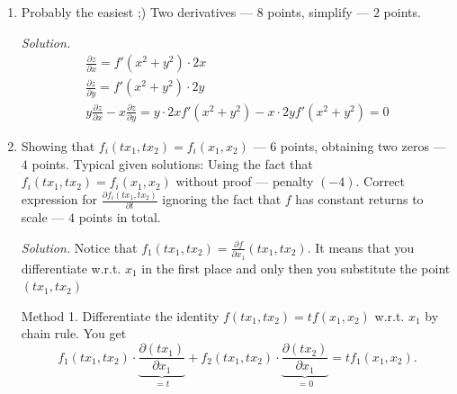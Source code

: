 \documentclass[12pt]{article} %
\theoremstyle{definition} %
\begin{document}
\begin{enumerate}
\begin{enumerate}
\begin{equation*}
{\begin{array}{cc}
 2 w^2 z+3 z^2 & 1
\end{array}
\right|
} {
\left|
\begin{array}{cc}
 4 w x y+6 x^3 y^3 z^2 & 12 w^2+4 x y z \\
 2 w^2 z+3 z^2 & 3 w^2+2 w z^2
\end{array}
\right|} = -\frac{
\left|
\begin{array}{cc}
 10 & 	10 \\
 5 & 1
\end{array}
\right|
}{
\left|
\begin{array}{cc}
 10 & 16 \\
 5 & 5
\end{array}
\right|
} = -\frac 4 3
\end{equation*}
\end{enumerate}

\item Probably the easiest ;) Two derivatives --- $8$ points, simplify --- $2$ points.

\textit{Solution.}
\begin{equation*}
\begin{array}{l}
\frac{\partial z}{\partial x} = f'(x^2+y^2) \cdot 2x\\
\frac{\partial z}{\partial y} = f'(x^2+y^2) \cdot 2y\\
y\frac{\partial z}{\partial x}-x \frac{\partial z}{\partial y} = y \cdot 2xf'(x^2+y^2) - x \cdot 2y f'(x^2+y^2) =0
\end{array}
\end{equation*}


\item Showing that $f_i(tx_1,tx_2)=f_i(x_1,x_2)$ --- $6$ points, obtaining two zeros --- $4$ points. Typical given solutions: Using the fact that $f_i(tx_1,tx_2)=f_i(x_1,x_2)$ without proof --- penalty $(-4)$. Correct expression for $\frac{\partial f_i(tx_1,tx_2)}{\partial t}$ ignoring the fact that $f$ has constant returns to scale --- $4$ points in total.

\textit{Solution.} Notice that $f_1 (tx_1,tx_2) = \frac{\partial f}{\partial x_1}(tx_1, tx_2).$ It means that you differentiate w.r.t. $x_1$ in the first place and only then you substitute the point $(tx_1, tx_2)$

\noindent Method 1. Differentiate the identity $f(tx_1,tx_2)=tf(x_1,x_2)$ w.r.t. $x_1$ by chain rule. You get
$$
f_1 (tx_1,tx_2)\cdot\underbrace{\frac{\partial (tx_1)}{\partial x_1}}_{=t} +  f_2 (tx_1,tx_2)\cdot\underbrace{\frac{\partial (tx_2)}{\partial x_1}}_{=0} = t f_1(x_1,x_2).
$$


\end{enumerate}
\end{document}
